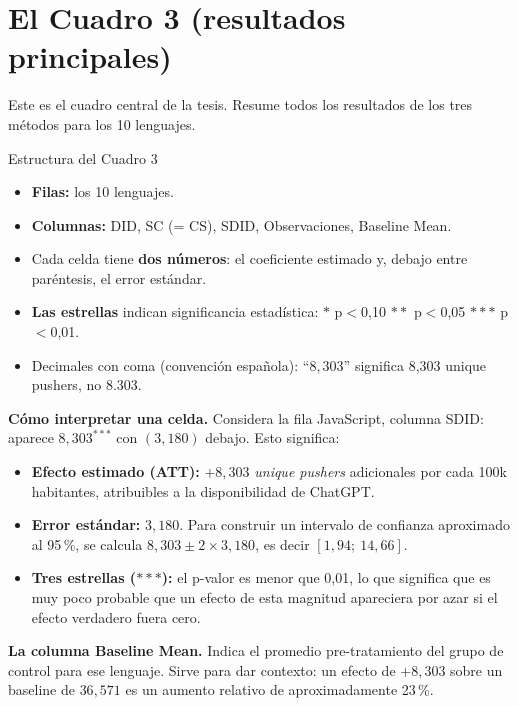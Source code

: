 \documentclass[11pt,a4paper]{article}
\begin{document}
\section{El Cuadro 3 (resultados principales)}

Este es el cuadro central de la tesis. Resume todos los resultados de los tres métodos para los 10 lenguajes.

\begin{lectura}{Estructura del Cuadro 3}
\begin{itemize}[leftmargin=*]
  \item \textbf{Filas:} los 10 lenguajes.
  \item \textbf{Columnas:} DID, SC (= CS), SDID, Observaciones, Baseline Mean.
  \item Cada celda tiene \textbf{dos números}: el coeficiente estimado y, debajo entre paréntesis, el error estándar.
  \item \textbf{Las estrellas} indican significancia estadística: $*$ p$<$0,10 \quad $**$ p$<$0,05 \quad $***$ p$<$0,01.
  \item Decimales con coma (convención española): ``$8{,}303$'' significa 8,303 unique pushers, no 8.303.
\end{itemize}
\end{lectura}

\textbf{Cómo interpretar una celda.} Considera la fila JavaScript, columna SDID: aparece $8{,}303^{***}$ con $(3{,}180)$ debajo. Esto significa:

\begin{itemize}[leftmargin=*]
  \item \textbf{Efecto estimado (ATT):} $+8{,}303$ \textit{unique pushers} adicionales por cada 100k habitantes, atribuibles a la disponibilidad de ChatGPT.
  \item \textbf{Error estándar:} $3{,}180$. Para construir un intervalo de confianza aproximado al 95\,\%, se calcula $8{,}303 \pm 2 \times 3{,}180$, es decir $[1{,}94;\ 14{,}66]$.
  \item \textbf{Tres estrellas ($***$):} el p-valor es menor que 0,01, lo que significa que es muy poco probable que un efecto de esta magnitud apareciera por azar si el efecto verdadero fuera cero.
\end{itemize}

\textbf{La columna Baseline Mean.} Indica el promedio pre-tratamiento del grupo de control para ese lenguaje. Sirve para dar contexto: un efecto de $+8{,}303$ sobre un baseline de $36{,}571$ es un aumento relativo de aproximadamente 23\,\%.
\end{document}
